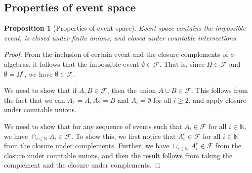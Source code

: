 \documentclass[letterpaper,10pt,english]{article}
\theoremstyle{plain}
\newtheorem{prop}[thm]{Proposition}
\theoremstyle{definition}
\theoremstyle{remark}
\newtheorem{rem}{Remark}
\newcommand{\N}{\mathbb{N}}
\newcommand{\sF}{\mathscr{F}}
\renewcommand{\ge}{\geqslant}
\begin{document}
\subsection{Properties of event space}
\begin{prop}[Properties of event space] Event space contains the impossible event, is closed under finite unions, and closed under countable intersections.
\end{prop}
\begin{proof}
From the inclusion of certain event and the closure complements of $\sigma$-algebras, 
it follows that the impossible event $\emptyset \in \sF$. 
That is, since $\Omega \in \sF$ and $\emptyset = \Omega^c$, we have $\emptyset \in \sF$.

We need to show that if $A,B \in \sF$, then the union $A\cup B \in \sF$. 
This follows from the fact that we can $A_1 = A, A_2 = B$ and $A_i = \emptyset$ for all $i \ge 2$, 
and apply closure under countable unions. 

We need to show that for any sequence of events such that $A_i \in \sF$ for all $i \in \N$, we have $\cap_{i \in \N}A_i \in \sF$. 
To show this, we first notice that $A_i^c \in \sF$ for all $i \in \N$ from the closure under complements. 
Further, we have $\cup_{i \in \N}A_i^c \in \sF$ from the closure under countable unions, 
and then the result follows from taking the complement and the closure under complements. 
\end{proof}

\end{document}
